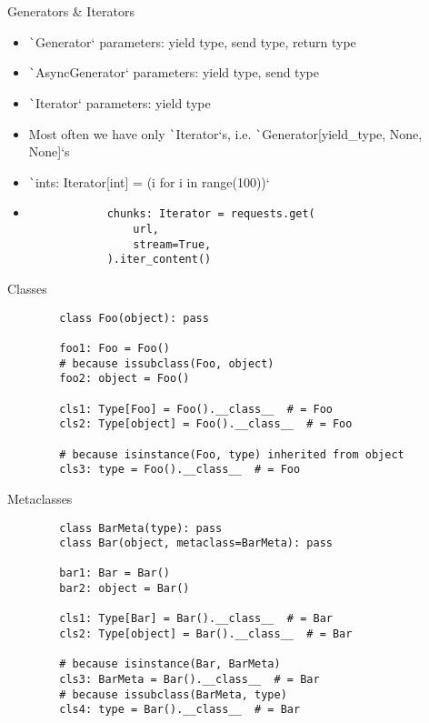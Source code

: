 \documentclass[10pt]{beamer}
\begin{document}
\begin{frame}[fragile]{Generators \& Iterators}
    \begin{itemize}[<+->]
        \item \texttt`Generator` parameters: yield type, send type, return type
        \item \texttt`AsyncGenerator` parameters: yield type, send type
        \item \texttt`Iterator` parameters: yield type
        \item Most often we have only \texttt`Iterator`s, i.e. \texttt`Generator[yield_type, None, None]`s
    \end{itemize}
    
    \pause\begin{examples}
    \begin{itemize}[<+->]
        \item \texttt`ints: Iterator[int] = (i for i in range(100))`
        \item \begin{verbatim}
            chunks: Iterator = requests.get(
                url,
                stream=True,
            ).iter_content()
        \end{verbatim}
    \end{itemize}
    \end{examples}
\end{frame}

\begin{frame}[fragile]{Classes}
    \begin{verbatim}
        class Foo(object): pass
        
        foo1: Foo = Foo()
        # because issubclass(Foo, object)
        foo2: object = Foo()
        
        cls1: Type[Foo] = Foo().__class__  # = Foo
        cls2: Type[object] = Foo().__class__  # = Foo
        
        # because isinstance(Foo, type) inherited from object
        cls3: type = Foo().__class__  # = Foo
    \end{verbatim}
\end{frame}

\begin{frame}[fragile]{Metaclasses}
    \begin{verbatim}
        class BarMeta(type): pass
        class Bar(object, metaclass=BarMeta): pass
        
        bar1: Bar = Bar()
        bar2: object = Bar()
    
        cls1: Type[Bar] = Bar().__class__  # = Bar
        cls2: Type[object] = Bar().__class__  # = Bar
        
        # because isinstance(Bar, BarMeta)
        cls3: BarMeta = Bar().__class__  # = Bar
        # because issubclass(BarMeta, type)
        cls4: type = Bar().__class__  # = Bar
    \end{verbatim}
\end{frame}
\end{document}
